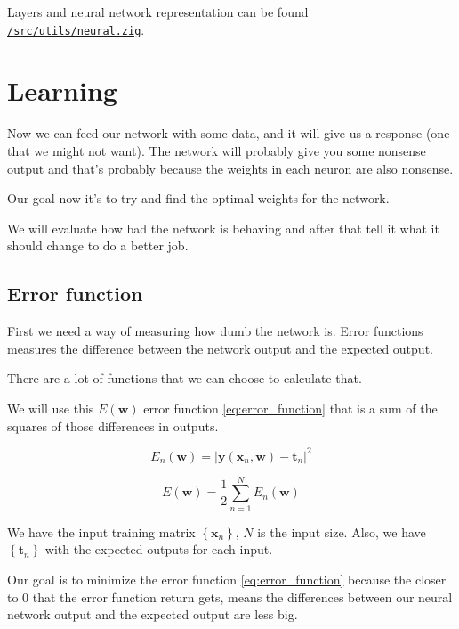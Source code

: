 \documentclass[a4paper,12pt]{article}
\theoremstyle{mytheoremstyle}
\theoremstyle{mytheoremstyle}
\theoremstyle{myproblemstyle}
\begin{document}
    Layers and neural network representation can be found \\
    \href{run:../src/utils/neural.zig}{\texttt{/src/utils/neural.zig}}.

    \section{Learning}

    Now we can feed our network with some data, and it will give us a response
    (one that we might not want). The network will probably give you some
    nonsense output and that's probably because the weights in each neuron are
    also nonsense.

    Our goal now it's to try and find the optimal weights for the network.

    We will evaluate how bad the network is behaving and after that tell it
    what it should change to do a better job.

    \subsection{Error function}

    First we need a way of measuring how dumb the network is. Error functions
    measures the difference between the network output and the expected output.

    There are a lot of functions that we can choose to calculate that.

    We will use this $ E \left( \mathbf{w} \right) $ error function
    \eqref{eq:error_function} that is a sum of the squares of those differences
    in outputs.

    \begin{equation}
        E_{n} \left( \mathbf{w} \right) = \left| \mathbf{y}(\mathbf{x}_{n}, \mathbf{w}) - \mathbf{t}_{n} \right|^{2}
    \end{equation}

    \begin{equation}
        E \left( \mathbf{w} \right) = \frac{1}{2} \displaystyle\sum_{n=1}^{N} E_{n}(\mathbf{w})
        \label{eq:error_function}
    \end{equation}

    We have the input training matrix $ \left\{ \mathbf{x}_{n} \right\} $, $ N $
    is the input size. Also, we have $ \left\{ \mathbf{t}_{n} \right\} $ with the
    expected outputs for each input.

    Our goal is to minimize the error function \eqref{eq:error_function}
    because the closer to 0 that the error function return gets, means the
    differences between our neural network output and the expected output are
    less big.
\end{document}
